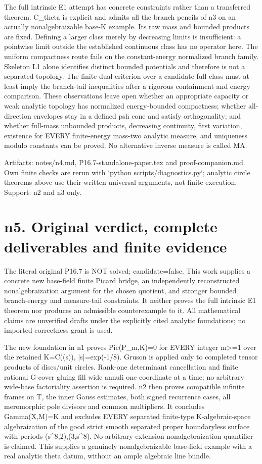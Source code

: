 \documentclass[11pt]{article}
\begin{document}
The full intrinsic E1 attempt has concrete constraints rather than a transferred theorem. C\_theta is explicit and admits all the branch pencils of n3 on an actually nonalgebraizable base-K example. Its raw mass and bounded products are fixed. Defining a larger class merely by decreasing limits is insufficient: a pointwise limit outside the established continuous class has no operator here. The uniform compactness route fails on the constant-energy normalized branch family. Skeleton L1 alone identifies distinct bounded potentials and therefore is not a separated topology. The finite dual criterion over a candidate full class must at least imply the branch-tail inequalities after a rigorous containment and energy comparison. These observations leave open whether an appropriate capacity or weak analytic topology has normalized energy-bounded compactness; whether all-direction envelopes stay in a defined psh cone and satisfy orthogonality; and whether full-mass unbounded products, decreasing continuity, first variation, existence for EVERY finite-energy mass-two analytic measure, and uniqueness modulo constants can be proved. No alternative inverse measure is called MA.

Artifacts: notes/n4.md, P16.7-standalone-paper.tex and proof-companion.md. Own finite checks are rerun with `python scripts/diagnostics.py`; analytic circle theorems above use their written universal arguments, not finite execution. Support: n2 and n3 only.


\section{n5. Original verdict, complete deliverables and finite evidence}

The literal original P16.7 is NOT solved; candidate=false. This work supplies a concrete new base-field finite Picard bridge, an independently reconstructed nonalgebraization argument for the chosen quotient, and stronger bounded branch-energy and measure-tail constraints. It neither proves the full intrinsic E1 theorem nor produces an admissible counterexample to it. All mathematical claims are unverified drafts under the explicitly cited analytic foundations; no imported correctness grant is used.

The new foundation in n1 proves Pic(P\_m,K)=0 for EVERY integer m>=1 over the retained K=C((s)), |s|=exp(-1/8). Gruson is applied only to completed tensor products of discs/unit circles. Rank-one determinant cancellation and finite rational G-cover gluing fill wide annuli one coordinate at a time; no arbitrary wide-base factoriality assertion is required. n2 then proves compatible infinite frames on T, the inner Gauss estimates, both signed recurrence cases, all meromorphic pole divisors and common multipliers. It concludes Gamma(X,M)=K and excludes EVERY separated finite-type K-algebraic-space algebraization of the good strict smooth separated proper boundaryless surface with periods (s\textasciicircum{}8,2),(3,s\textasciicircum{}8). No arbitrary-extension nonalgebraization quantifier is claimed. This supplies a genuinely nonalgebraizable base-field example with a real analytic theta datum, without an ample algebraic line bundle.
\end{document}
